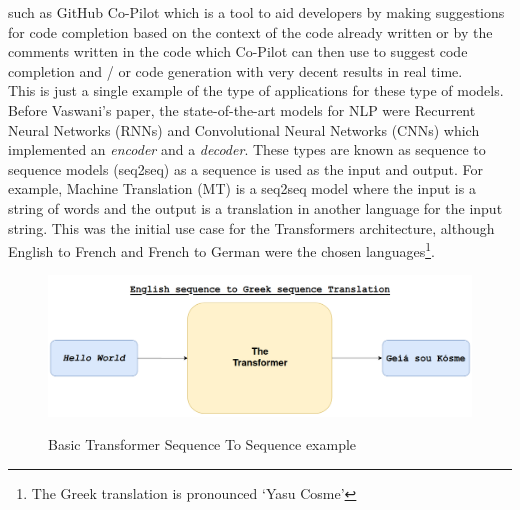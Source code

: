 such as GitHub Co-Pilot which is a tool to aid developers by making suggestions for code completion based on the context of the code already written or
by the comments written in the code which Co-Pilot can then use to suggest code completion and / or code generation with very decent results in real time.\\
This is just a single example of the type of applications for these type of models.
\bigbreak
Before Vaswani's paper, the state-of-the-art models for NLP were Recurrent Neural Networks (RNNs) and Convolutional Neural Networks (CNNs) which implemented an
\emph{encoder} and a \emph{decoder}. These types are known as sequence to sequence models (seq2seq) as a sequence is used as the input and output.
\bigbreak
For example, Machine Translation (MT) is a seq2seq model where the input is a string of words and the output is a translation in another language for the
input string. This was the initial use case for the Transformers architecture, although English to French and French to German were the chosen
languages\footnote{The Greek translation is pronounced `Yasu Cosme'}.
\begin{figure}[H]
	\centering
	\includegraphics[width=0.8\linewidth]{figures/basic_transformer.png}
	\label{fig:basic_transformer}
	\caption{Basic Transformer Sequence To Sequence example}
\end{figure}
